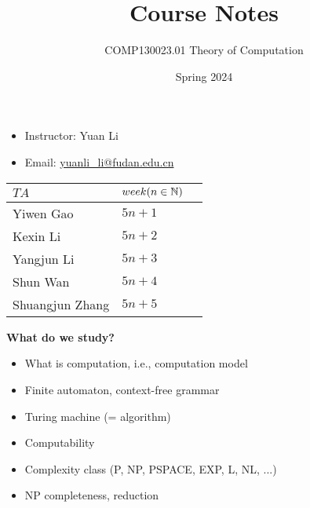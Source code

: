 \title{Course Notes}
\date{Spring 2024}
\author{COMP130023.01 Theory of Computation}
\maketitle
\thispagestyle{empty}

\begin{itemize}
    \item Instructor: Yuan Li
    \item Email: \href{mailto:yuanli_li@fudan.edu.cn}{yuanli\_li@fudan.edu.cn}
\end{itemize}


\begin{table}[htbp]
    \centering
    \begin{tabularx}{\textwidth}{XXX}
        \toprule
    $TA$ & $week(n \in \mathbb{N})$ \\
    \midrule
    Yiwen Gao & $5n+1$ \\
    Kexin Li & $5n+2$ \\
    Yangjun Li & $5n+3$ \\
    Shun Wan & $5n+4$ \\
    Shuangjun Zhang & $5n+5$ \\
        \bottomrule
    \end{tabularx}
    \label{tab:mytable}
\end{table}

\textbf{What do we study?}
\begin{itemize}
    \item What is computation, i.e., computation model
    \item Finite automaton, context-free grammar
    \item Turing machine (= algorithm)
    \item Computability
    \item Complexity class (P, NP, PSPACE, EXP, L, NL, ...)
    \item NP completeness, reduction
\end{itemize}

\newpage

\tableofcontents
\thispagestyle{empty}

\setcounter{page}{0}